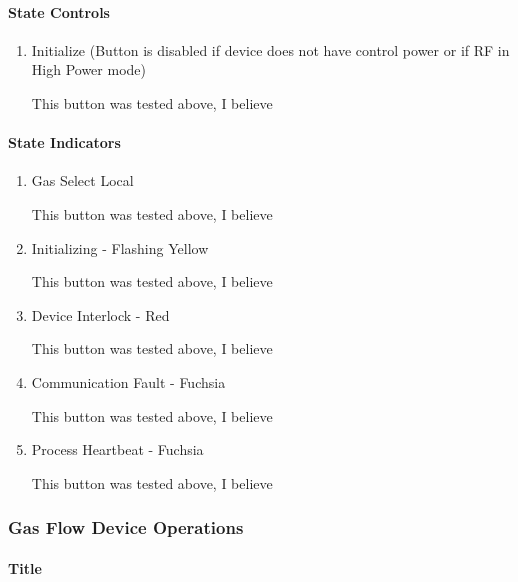 \documentclass[11pt]{book}		%
\begin{document}
\paragraph{State Controls}

\begin{enumerate}
 \item Initialize (Button is disabled if device does not have control power or if RF in High Power mode)

\color{red}
This button was tested above, I believe
\color{black}

\end{enumerate}

\paragraph{State Indicators}

\begin{enumerate}
 \item Gas Select Local

\color{red}
This button was tested above, I believe
\color{black}

 \item Initializing - Flashing Yellow

\color{red}
This button was tested above, I believe
\color{black}

 \item Device Interlock - Red

\color{red}
This button was tested above, I believe
\color{black}

 \item Communication Fault - Fuchsia

\color{red}
This button was tested above, I believe
\color{black}

 \item Process Heartbeat - Fuchsia

\color{red}
This button was tested above, I believe
\color{black}

\end{enumerate}

\subsubsection{Gas Flow Device Operations}


\paragraph{Title}
\end{document}
